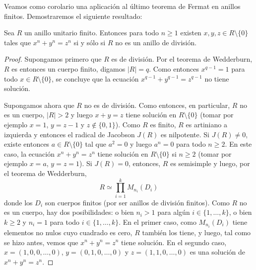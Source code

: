 Veamos como corolario una aplicación al último teorema de Fermat en anillos
finitos. Demostraremos el siguiente resultado:

\begin{theorem}
	Sea $R$ un anillo unitario finito. Entonces para todo $n\geq1$ existen $x,y,z\in
	R\setminus\{0\}$ tales que $x^n+y^n=z^n$ si y sólo si $R$ no es un anillo
	de división.
\end{theorem}

\begin{proof}
	Supongamos primero que $R$ es de división. Por el teorema de Wedderburn,
	$R$ es entonces un cuerpo finito, digamos $|R|=q$. Como entonces
	$x^{q-1}=1$ para todo $x\in R\setminus\{0\}$, se concluye que la ecuación
	$x^{q-1}+y^{q-1}=z^{q-1}$ no tiene solución.

	Supongamos ahora que $R$ no es de división. Como entonces, en particular,
	$R$ no es un cuerpo, $|R|>2$ y luego $x+y=z$ tiene solución en
	$R\setminus\{0\}$ (tomar por ejemplo $x=1$, $y=z-1$ y $z\not\in\{0,1\}$).
	Como $R$ es finito, $R$ es artiniano a izquierda y entonces el radical de
	Jacobson $J(R)$ es nilpotente. Si $J(R)\ne 0$, existe entonces $a\in
	R\setminus\{0\}$ tal que $a^2=0$ y luego $a^n=0$ para todo $n\geq2$. En
	este caso, la ecuación $x^n+y^n=z^n$ tiene solución en $R\setminus\{0\}$ si
	$n\geq 2$ (tomar por ejemplo $x=a$, $y=z=1$). Si $J(R)=0$, entonces, $R$ es
	semisimple y luego, por el teorema de Wedderburn,
	\[
		R\simeq \prod_{i=1}^k M_{n_i}(D_i)
	\]
	donde los $D_i$ son cuerpos finitos (por ser anillos de división finitos).
	Como $R$ no es un cuerpo, hay dos posibilidades: o bien $n_i>1$ para algún
	$i\in\{1,\dots,k\}$, o bien $k\geq 2$ y $n_i=1$ para todo
	$i\in\{1,\dots,k\}$. En el primer caso, como $M_{n_i}(D_i)$ tiene elementos
	no nulos cuyo cuadrado es cero, $R$ también los tiene, y luego, tal como se
	hizo antes, vemos que $x^n+y^n=z^n$ tiene solución. En el segundo caso,
	$x=(1,0,0,\dots,0)$, $y=(0,1,0,\dots,0)$ y $z=(1,1,0,\dots,0)$ es una
	solución de $x^n+y^n=z^n$.
\end{proof}
